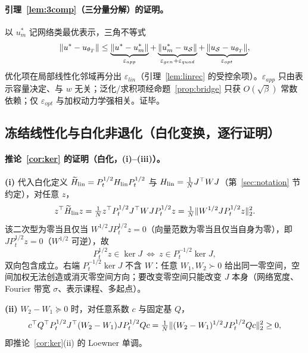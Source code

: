 \documentclass[fontset=windows,11pt]{ctexart}
\DeclarePairedDelimiter{\norm}{\lVert}{\rVert}
\newcommand{\W}{W}
\newcommand{\wt}[1]{\widetilde{#1}}
\numberwithin{equation}{section}
\begin{document}
\paragraph{引理~\ref{lem:3comp}（三分量分解）的证明。}
以 $u_m^*$ 记网络类最优表示，三角不等式
\[
\norm{u^*-u_{\theta_T}}\le\underbrace{\norm{u^*-u_m^*}}_{\varepsilon_{app}}+\underbrace{\norm{u_m^*-u_{\mathcal S}}}_{\varepsilon_{gen}+\varepsilon_{quad}}+\underbrace{\norm{u_{\mathcal S}-u_{\theta_T}}}_{\varepsilon_{opt}},
\]
优化项在局部线性化邻域再分出 $\varepsilon_{lin}$（引理~\ref{lem:linrec} 的受控余项）。$\varepsilon_{app}$ 只由表示容量决定、与 $w$ 无关；泛化/求积项经命题~\ref{prop:bridge} 只获 $O(\sqrt\beta)$ 常数依赖；仅 $\varepsilon_{opt}$ 与加权动力学强相关。证毕。

\subsection{冻结线性化与白化非退化（白化变换，逐行证明）}

\paragraph{推论~\ref{cor:ker} 的证明（白化，(i)--(iii)）。}
\textbf{(i)} 代入白化定义 $\wt H_{\rm lin}=P_t^{1/2}H_{\rm lin}P_t^{1/2}$ 与 $H_{\rm lin}=\tfrac1N J^\top\W J$（第~\ref{sec:notation} 节约定），对任意 $z$，
\begin{equation}
z^\top\wt H_{\rm lin}z
=\tfrac1N z^\top P_t^{1/2}J^\top\W JP_t^{1/2}z
=\tfrac1N\norm{\W^{1/2}JP_t^{1/2}z}_2^2 .
\end{equation}
该二次型为零当且仅当 $\W^{1/2}JP_t^{1/2}z=0$（向量范数为零当且仅当自身为零），即 $JP_t^{1/2}z=0$（$\W^{1/2}$ 可逆），故
\begin{equation}
P_t^{1/2}z\in\ker J\ \Longleftrightarrow\ z\in P_t^{-1/2}\ker J,
\end{equation}
双向包含成立。右端 $P_t^{-1/2}\ker J$ 不含 $\W$：任意 $\W_1,\W_2\succ0$ 给出同一零空间，空间加权无法创造或消灭零空间方向；要改变零空间只能改变 $J$ 本身（网络宽度、Fourier 带宽 $\sigma$、表示课程、多起点）。

\noindent\textbf{(ii)} $\W_2-\W_1\succeq0$ 时，对任意系数 $c$ 与固定基 $Q$，
\begin{equation}
c^\top Q^\top P_t^{1/2}J^\top(\W_2-\W_1)JP_t^{1/2}Qc
=\tfrac1N\norm{(\W_2-\W_1)^{1/2}JP_t^{1/2}Qc}_2^2\ge0,
\end{equation}
即推论~\ref{cor:ker}(ii) 的 Loewner 单调。
\end{document}
